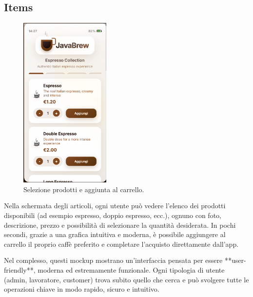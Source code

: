 \subsection{Items}
\begin{figure}[H]
    \centering
    \includegraphics[width=0.4\textwidth]{./assets/items.png}
    \caption{Selezione prodotti e aggiunta al carrello.}
\end{figure}
Nella schermata degli articoli, ogni utente può vedere l’elenco dei prodotti disponibili (ad esempio espresso, doppio espresso, ecc.), ognuno con foto, descrizione, prezzo e possibilità di selezionare la quantità desiderata. In pochi secondi, grazie a una grafica intuitiva e moderna, è possibile aggiungere al carrello il proprio caffè preferito e completare l’acquisto direttamente dall’app.

\bigskip
Nel complesso, questi mockup mostrano un’interfaccia pensata per essere **user-friendly**, moderna ed estremamente funzionale. Ogni tipologia di utente (admin, lavoratore, customer) trova subito quello che cerca e può svolgere tutte le operazioni chiave in modo rapido, sicuro e intuitivo.
